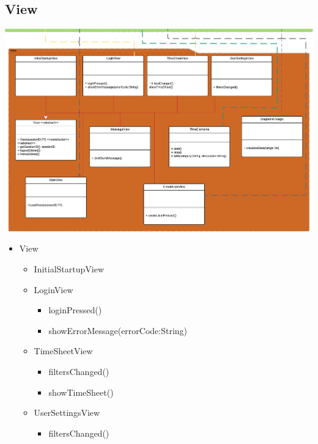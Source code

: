 \begin{itemize}
    \subsection{View}
    \includegraphics[width=\linewidth]{Diagramms/class/view.pdf}\\
        \begin{itemize}
            \item{View}
                \begin{itemize}

                    \item{InitialStartupView}
                    \begin{itemize}
                    \end{itemize}

                    \item{LoginView}
                    \begin{itemize}
                        \item{loginPressed()}
                        \item{showErrorMessage(errorCode:String)}
                    \end{itemize}

                    \item{TimeSheetView}
                    \begin{itemize}
                        \item{filtersChanged()}
                        \item{showTimeSheet()}
                    \end{itemize}

                    \item{UserSettingsView}
                    \begin{itemize}
                        \item{filtersChanged()}
                    \end{itemize}


\end{itemize}
\end{itemize}
\end{itemize}
